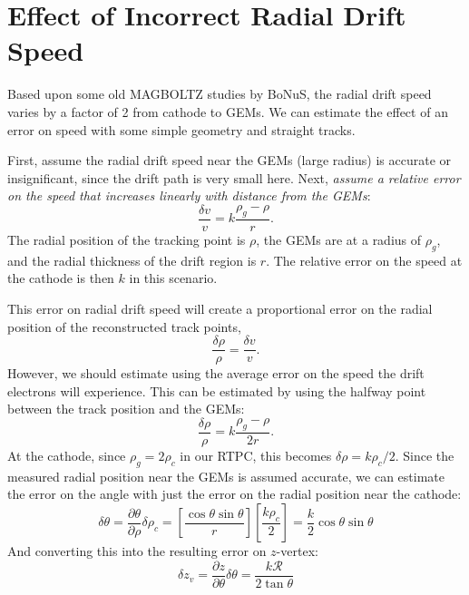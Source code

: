 \documentclass[amsmath,amssymb,notitlepage,11pt]{revtex4-1}
\begin{document}
\section{Effect of Incorrect Radial Drift Speed}
Based upon some old MAGBOLTZ studies by BoNuS, the radial drift speed varies by a factor of 2 from cathode to GEMs.   We can estimate the effect of an error on speed with some simple geometry and straight tracks.

First, assume the radial drift speed near the GEMs (large radius) is accurate or insignificant, since the drift path is very small here.  Next, {\it assume a relative error on the speed that increases linearly with distance from the GEMs}:
\begin{equation}
    \frac{\delta v}{v}=k\frac{\rho_g-\rho}{r}.
    \label{eq:dvoverv}
\end{equation}
The radial position of the tracking point is $\rho$, the GEMs are at a radius of $\rho_g$, and the radial thickness of the drift region is $r$.  The relative error on the speed at the cathode is then $k$ in this scenario.

This error on radial drift speed will create a proportional error on the radial position of the reconstructed track points,
\begin{equation}
    \frac{\delta\rho}{\rho}=\frac{\delta v}{v}.
    \label{}
\end{equation}
However, we should estimate using the average error on the speed the drift electrons will experience.  This can be estimated by using the halfway point between the track position and the GEMs:
\begin{equation}
    \frac{\delta\rho}{\rho}=k\frac{\rho_g-\rho}{2r}.
    \label{}
\end{equation}
At the cathode, since $\rho_g=2\rho_c$ in our RTPC, this becomes $\delta\rho=k\rho_c/2$.
Since the measured radial position near the GEMs is assumed accurate, we can estimate the error on the angle with just the error on the radial position near the cathode:
\begin{equation}
    \delta\theta = \frac{\partial\theta}{\partial\rho}\delta\rho_c=\left[\frac{\cos\theta\sin\theta}{r}\right]\left[\frac{k\rho_c}{2}\right]=\frac{k}{2}\cos\theta\sin\theta
    \label{}
\end{equation}
And converting this into the resulting error on $z$-vertex:
\begin{equation}
    \delta z_v=\frac{\partial z}{\partial\theta}\delta\theta=\frac{k\mathcal{R}}{2\tan\theta}
    \label{}
\end{equation}
\end{document}
